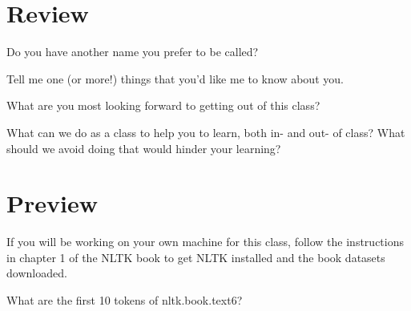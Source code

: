 \documentclass[11pt,letterpaper,boxed]{hmcpset}
\begin{document}
\section*{Review} 
\begin{problem}
Do you have another name you prefer to be called?
\end{problem}

\begin{solution}
\end{solution}

\begin{problem}
Tell me one (or more!) things that you'd like me to know about you.
\end{problem}

\begin{solution}
\vspace{2cm}
\end{solution}

\begin{problem}
What are you most looking forward to getting out of this class?
\end{problem}

\begin{solution}
\vspace{2cm}
\end{solution}

\begin{problem}
What can we do as a class to help you to learn, both in- and out- of
class? What should we avoid doing that would hinder your learning?
\end{problem}

\begin{solution}
\vspace{2cm}
\end{solution}

\pagebreak

\section*{Preview} 
If you will be working on your own machine for this class, follow the
instructions in chapter 1 of the NLTK book to get NLTK installed and
the book datasets downloaded. 

\begin{problem}
What are the first 10 tokens of nltk.book.text6?
\end{problem}

\begin{solution}
\vspace{4cm}
\end{solution}
\end{document}
